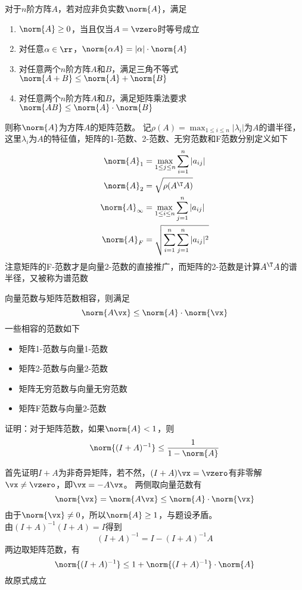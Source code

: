\begin{definition}[矩阵的范数]
    对于$n$阶方阵$A$，若对应非负实数$\norm{A}$，满足
    \begin{enumerate}
        \item $\norm{A}\geq 0$，当且仅当$A=\vzero$时等号成立
        \item 对任意$\alpha\in\rr$，$\norm{\alpha A}=|\alpha|\cdot\norm{A}$
        \item 对任意两个$n$阶方阵$A$和$B$，满足三角不等式$\norm{A+B}\leq\norm{A}+\norm{B}$
        \item 对任意两个$n$阶方阵$A$和$B$，满足矩阵乘法要求$\norm{AB}\leq\norm{A}\cdot\norm{B}$
    \end{enumerate}
    则称$\norm{A}$为方阵$A$的矩阵范数。
    记$\rho(A)=\max_{1\leq i\leq n}|\lambda_i|$为$A$的谱半径，这里$\lambda_i$为$A$的特征值，矩阵的1-范数、2-范数、无穷范数和F范数分别定义如下
    \[\begin{aligned}
        \norm{A}_1&=\max_{1\leq j\leq n}\sum_{i=1}^n|a_{ij}|\\
        \norm{A}_2&=\sqrt{\rho(A^\T A)}\\
        \norm{A}_\infty&=\max_{1\leq i\leq n}\sum_{j=1}^n|a_{ij}|\\
        \norm{A}_F&=\sqrt{\sum_{i=1}^n\sum_{j=1}^n|a_{ij}|^2}
    \end{aligned}\]
    注意矩阵的F-范数才是向量2-范数的直接推广，而矩阵的2-范数是计算$A^\T A$的谱半径，又被称为谱范数
\end{definition}
\begin{definition}[向量范数与矩阵范数相容]
向量范数与矩阵范数相容，则满足
\[\norm{A\vx}\leq\norm{A}\cdot\norm{\vx}\]
一些相容的范数如下
\begin{itemize}
    \item 矩阵1-范数与向量1-范数
    \item 矩阵2-范数与向量2-范数
    \item 矩阵无穷范数与向量无穷范数
    \item 矩阵F范数与向量2-范数
\end{itemize}
\end{definition}

\begin{example}
    证明：对于矩阵范数，如果$\norm{A}<1$，则
    \[\norm{(I+A)^{-1}}\leq\frac{1}{1-\norm{A}}\]
\end{example}
\begin{analysis}
    首先证明$I+A$为非奇异矩阵，若不然，$(I+A)\vx=\vzero$有非零解$\vx\ne\vzero$，即$\vx=-A\vx$。
    两侧取向量范数有
    \[\norm{\vx}=\norm{A\vx}\leq\norm{A}\cdot\norm{\vx}\]
    由于$\norm{\vx}\ne 0$，所以$\norm{A}\geq 1$，与题设矛盾。\\
    由$(I+A)^{-1}(I+A)=I$得到
    \[(I+A)^{-1}=I-(I+A)^{-1}A\]
    两边取矩阵范数，有
    \[\norm{(I+A)^{-1}}\leq1+\norm{(I+A)^{-1}}\cdot\norm{A}\]
    故原式成立
\end{analysis}

